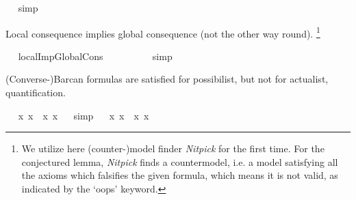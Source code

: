\begin{isabellebody}
\ %
%
\isamarkupfalse%
\ simp\ \ \ \ %
%
%
%
%
\begin{isamarkuptext}%
Local consequence implies global consequence (not the other way round).
  \footnote{We utilize here (counter-)model finder \emph{Nitpick} \cite{Nitpick} for the first time.  
  For the conjectured lemma, \emph{Nitpick} finds a countermodel, i.e. a model satisfying all 
  the axioms which falsifies the given formula, which means it is not valid, as indicated by the `oops' keyword.}%
\end{isamarkuptext}\isamarkuptrue%
\ \isamarkupfalse%
\ localImpGlobalCons{\isacharcolon}\ {\isachardoublequoteopen}{\isasymlfloor}{\isasymphi}\ \isactrlbold {\isasymrightarrow}\ {\isasymxi}{\isasymrfloor}\ {\isasymLongrightarrow}\ {\isasymlfloor}{\isasymphi}{\isasymrfloor}\ {\isasymlongrightarrow}\ {\isasymlfloor}{\isasymxi}{\isasymrfloor}{\isachardoublequoteclose}%
\ %
%
\isamarkupfalse%
\ simp%
%
%
\isanewline
\ \isamarkupfalse%
\ {\isachardoublequoteopen}{\isasymlfloor}{\isasymphi}{\isasymrfloor}\ {\isasymlongrightarrow}\ {\isasymlfloor}{\isasymxi}{\isasymrfloor}\ {\isasymLongrightarrow}\ {\isasymlfloor}{\isasymphi}\ \isactrlbold {\isasymrightarrow}\ {\isasymxi}{\isasymrfloor}{\isachardoublequoteclose}\ \isamarkupfalse%
%
\ %
%
\isamarkupfalse%
\ %
%
%
%
%
\begin{isamarkuptext}%
(Converse-)Barcan formulas are satisfied for possibilist, but not for actualist, quantification.%
\end{isamarkuptext}\isamarkuptrue%
\ \isamarkupfalse%
\ {\isachardoublequoteopen}{\isasymlfloor}{\isacharparenleft}\isactrlbold {\isasymforall}x{\isachardot}\isactrlbold {\isasymbox}{\isacharparenleft}{\isasymphi}\ x{\isacharparenright}{\isacharparenright}\ \isactrlbold {\isasymrightarrow}\ \isactrlbold {\isasymbox}{\isacharparenleft}\isactrlbold {\isasymforall}x{\isachardot}{\isacharparenleft}{\isasymphi}\ x{\isacharparenright}{\isacharparenright}{\isasymrfloor}{\isachardoublequoteclose}%
\ %
%
\isamarkupfalse%
\ simp%
%
%
\isanewline
\ \isamarkupfalse%
\ {\isachardoublequoteopen}{\isasymlfloor}\isactrlbold {\isasymbox}{\isacharparenleft}\isactrlbold {\isasymforall}x{\isachardot}{\isacharparenleft}{\isasymphi}\ x{\isacharparenright}{\isacharparenright}\ \isactrlbold {\isasymrightarrow}\ {\isacharparenleft}\isactrlbold {\isasymforall}x{\isachardot}\isactrlbold {\isasymbox}{\isacharparenleft}{\isasymphi}\ x{\isacharparenright}{\isacharparenright}{\isasymrfloor}{\isachardoublequoteclose}%

\end{isabellebody}
